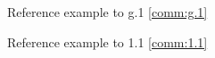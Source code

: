 \documentclass[11pt]{article}
\begin{document}
\setcounter{CommentCounter}{0} %

\reviewercomment{\lipsum[2]}

\begin{response}

Reference example to g.1 \ref{comm:g.1}

Reference example to 1.1 \ref{comm:1.1}
\end{response}




\end{document}
